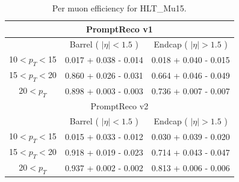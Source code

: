 \begin{table}[!ht]
\begin{center}
\begin{tabular}{c|c|c} 
\hline
\multicolumn{3}{c}{PromptReco v1}                                \\
\hline
              & Barrel ( $|\eta|<1.5$ )  & Endcap ( $|\eta|>1.5$ ) \\  
\hline
\hline
10$<p_{T}<$15 & 0.017 + 0.038 - 0.014  & 0.018 + 0.040 - 0.015     \\  \hline
15$<p_{T}<$20 & 0.860 + 0.026 - 0.031  & 0.664 + 0.046 - 0.049     \\  \hline
20$<p_{T}$    & 0.898 + 0.003 - 0.003  & 0.736 + 0.007 - 0.007     \\
\hline
\hline
\multicolumn{3}{c}{PromptReco v2}                                \\
\hline
              & Barrel ( $|\eta|<1.5$ )  & Endcap ( $|\eta|>1.5$ ) \\  
\hline
\hline
10$<p_{T}<$15 & 0.015 + 0.033 - 0.012  & 0.030 + 0.039 - 0.020     \\  \hline
15$<p_{T}<$20 & 0.918 + 0.019 - 0.023  & 0.714 + 0.043 - 0.047     \\  \hline
20$<p_{T}$    & 0.937 + 0.002 - 0.002  & 0.813 + 0.006 - 0.006     \\
\hline
\end{tabular}
\caption{Per muon efficiency for HLT\_Mu15.}
\label{tab:eff_single_mu}
\end{center}
\end{table}

